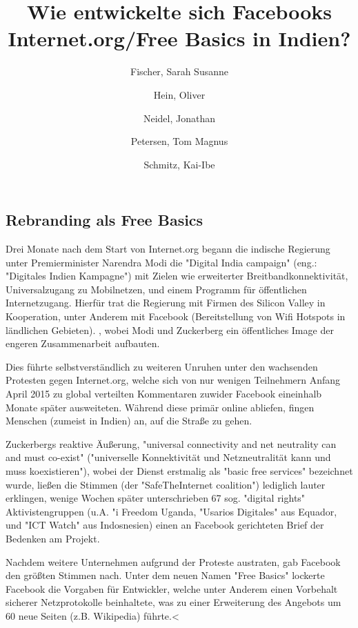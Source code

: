 \documentclass{article}
\title{Wie entwickelte sich Facebooks Internet.org/Free Basics in Indien?}
\author{
  Fischer, Sarah Susanne\\
  \and
  Hein, Oliver\\
  \and
  Neidel, Jonathan\\
  \and
  Petersen, Tom Magnus\\
  \and
  Schmitz, Kai-Ibe\\
}
\begin{document}
\maketitle

\subsection{Rebranding als Free Basics}

Drei Monate nach dem Start von Internet.org begann die indische Regierung unter Premierminister Narendra Modi die "Digital India campaign" (eng.: "Digitales Indien Kampagne") mit Zielen wie erweiterter Breitbandkonnektivität, Universalzugang zu Mobilnetzen, und einem Programm für öffentlichen Internetzugang. %
Hierfür trat die Regierung mit Firmen des Silicon Valley in Kooperation, unter Anderem mit Facebook (Bereitstellung von Wifi Hotspots in ländlichen Gebieten).%
, wobei Modi und Zuckerberg ein öffentliches Image der engeren Zusammenarbeit aufbauten.

\medskip

Dies führte selbstverständlich zu weiteren Unruhen unter den wachsenden Protesten gegen Internet.org, welche sich von nur wenigen Teilnehmern Anfang April 2015 zu global verteilten Kommentaren zuwider Facebook eineinhalb Monate später ausweiteten. %
Während diese primär online abliefen, fingen Menschen (zumeist in Indien) an, auf die Straße zu gehen.

\medskip

Zuckerbergs reaktive Äußerung, "universal connectivity and net neutrality can and must co-exist" ("universelle Konnektivität und Netzneutralität kann und muss koexistieren"), wobei der Dienst erstmalig als "basic free services" bezeichnet wurde, ließen die Stimmen (der "SafeTheInternet coalition") lediglich lauter erklingen, wenige Wochen später unterschrieben 67 sog. "digital rights" Aktivistengruppen (u.A. "i Freedom Uganda, "Usarios Digitales" aus Equador, und "ICT Watch" aus Indosnesien) einen an Facebook gerichteten Brief der Bedenken am Projekt.

\medskip
\medskip

Nachdem weitere Unternehmen aufgrund der Proteste austraten, gab Facebook den größten Stimmen nach. Unter dem neuen Namen "Free Basics" lockerte Facebook die Vorgaben für Entwickler, welche unter Anderem einen Vorbehalt sicherer Netzprotokolle beinhaltete, was zu einer Erweiterung des Angebots um 60 neue Seiten (z.B. Wikipedia) führte.<

\medskip

\end{document}
